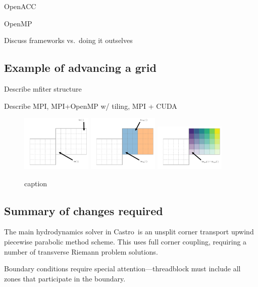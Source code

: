 \documentclass[twocolumn,times]{aastex62}
\newcommand{\castro}{{\sf Castro}}
\begin{document}
OpenACC


OpenMP

Discuss frameworks vs.\ doing it outselves




\subsection{Example of advancing a grid}

Describe mfiter structure

Describe MPI, MPI+OpenMP w/ tiling, MPI + CUDA

\begin{figure}
\centering
\includegraphics[width=0.3\textwidth]{gpu_1}
\includegraphics[width=0.3\textwidth]{gpu_2}
\includegraphics[width=0.3\textwidth]{gpu_3}
\caption{\label{fig:loops} caption}
\end{figure}

\subsection{Summary of changes required}

The main hydrodynamics solver in \castro\ is an unsplit corner
transport upwind \citep{ppmunsplit} piecewise parabolic method
\citep{ppm} scheme.  This uses full corner coupling, requiring a
number of transverse Riemann problem solutions.


Boundary conditions require special attention---threadblock must include
all zones that participate in the boundary.
\end{document}
